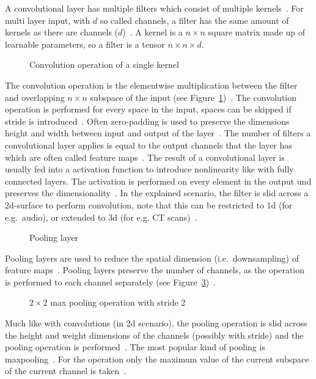 A convolutional layer has multiple filters which consist of multiple
kernels~\citep{chauhan_review_2018}.
For multi layer input, with $d$ so called channels, a filter has the same amount of kernels as there
are channels ($d$)~\citep{ponti_everything_2017}.
A kernel is a $n\times n$ square matrix made up of learnable parameters, so a filter is a tensor
$n\times n\times d$.
\begin{figure}[ht]
    \centering
    
    \caption{Convolution operation of a single kernel~\citep{chauhan_review_2018}\label{fig:conv-layer}}
\end{figure}
The convolution operation is the elementwise multiplication between the filter and overlapping
$n\times n$ subspace of the input (see Figure~\ref{fig:conv-layer})~\citep{ponti_everything_2017}.
The convolution operation is performed for every space in the input, spaces can be skipped if
stride is introduced~\citep{ponti_everything_2017}.
Often zero-padding is used to preserve the dimensions height and width between input and output of
the layer~\citep{ponti_everything_2017}.
The number of filters a convolutional layer applies is equal to the output channels that the layer
has which are often called feature maps~\citep{ponti_everything_2017}.
The result of a convolutional layer is usually fed into a activation function to introduce
nonlinearity like with fully connected layers.
The activation is performed on every element in the output und preserves the
dimensionality~\citep{ponti_everything_2017}.
In the explained scenario, the filter is slid across a 2d-surface to perform convolution, note that
this can be restricted to 1d (for e.g.\ audio), or extended to 3d (for e.g. CT
scans)~\citep{goodfellow_deep_2016}.

\begin{figure}[h]
    \centering
    \caption{Pooling layer~\label{fig:pool-layer}}
\end{figure}
Pooling layers are used to reduce the spatial dimension (i.e.\ downsampling) of feature
maps~\citep{ponti_everything_2017}.
Pooling layers preserve the number of channels, as the operation is performed to each channel
separately (see Figure~\ref{fig:pool-layer})~\citep{chauhan_review_2018}.
\begin{figure}[ht]
    \centering
    \caption{$2\times 2$ max pooling operation with stride
        2~\citep{chauhan_review_2018}\label{fig:pool-layer}}
\end{figure}
Much like with convolutions (in 2d scenario), the pooling operation is slid across the height and
weight dimensions of the channels (possibly with stride) and the pooling operation is
performed~\citep{ponti_everything_2017,chauhan_review_2018}.
The most popular kind of pooling is maxpooling~\citep{ponti_everything_2017}.
For the operation only the maximum value of the current subspace of the current channel is
taken~\citep{chauhan_review_2018}.

